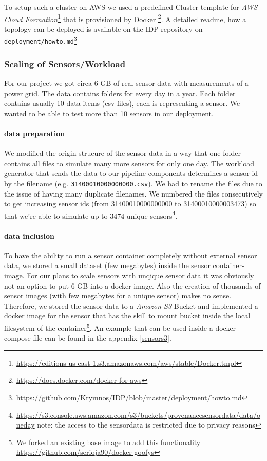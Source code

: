 To setup such a cluster on AWS we used a predefined Cluster template for \emph{AWS Cloud Formation}\footnote{\url{https://editions-us-east-1.s3.amazonaws.com/aws/stable/Docker.tmpl}} that is provisioned by Docker \footnote{\url{https://docs.docker.com/docker-for-aws}}. A detailed readme, how a topology can be deployed is available on the IDP repository on \texttt{deployment/howto.md}\footnote{\url{https://github.com/Krymnos/IDP/blob/master/deployment/howto.md}}

\subsubsection*{Scaling of Sensors/Workload}
For our project we got circa 6 GB of real sensor data with measurements of a power grid. The data contains folders for every day in a year. Each folder contains usually 10 data items (csv files), each is representing a sensor. We wanted to be able to test more than 10 sensors in our deployment.

\paragraph*{data preparation}
We modified the origin strucure of the sensor data in a way that one folder contains all files to simulate many more sensors for only one day.
The workload generator that sends the data to our pipeline components determines a sensor id by the filename (e.g. \texttt{31400010000000000.csv}). We had to rename the files due to the issue of having many duplicate filenames. We numbered the files consecutively to get increasing sensor ids (from 31400010000000000 to 31400010000003473) so that we're able to simulate up to 3474 unique sensors\footnote{\url{https://s3.console.aws.amazon.com/s3/buckets/provenancesensordata/data/oneday} note: the access to the sensordata is restricted due to privacy reasons}.

\paragraph*{data inclusion}
To have the ability to run a sensor container completely without external sensor data, we stored a small dataset (few megabytes) inside the sensor container-image.
For our plans to scale sensors with unqique sensor data it was obviously not an option to put 6 GB into a docker image. Also the creation of thousands of sensor images (with few megabytes for a unique sensor) makes no sense.
Therefore, we stored the sensor data to a \emph{Amazon S3} Bucket and implemented a docker image for the sensor that has the skill to mount bucket inside the local filesystem of the container\footnote{We forked an existing base image to add this functionality \url{https://github.com/serioja90/docker-goofys}}. An example that can be used inside a docker compose file can be found in the appendix \ref{sensors3}.

